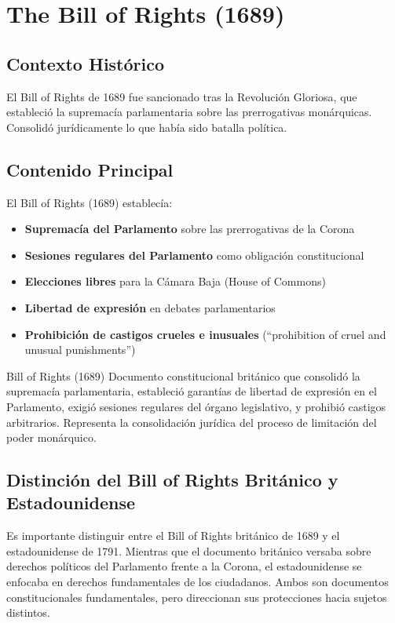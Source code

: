 \documentclass[12pt,oneside]{book}
\begin{document}
\section{The Bill of Rights (1689)}

\subsection{Contexto Histórico}

El Bill of Rights de 1689 fue sancionado tras la Revolución Gloriosa, que estableció la supremacía parlamentaria sobre las prerrogativas monárquicas. Consolidó jurídicamente lo que había sido batalla política.

\subsection{Contenido Principal}

El Bill of Rights (1689) establecía:

\begin{itemize}
    \item \textbf{Supremacía del Parlamento} sobre las prerrogativas de la Corona
    \item \textbf{Sesiones regulares del Parlamento} como obligación constitucional
    \item \textbf{Elecciones libres} para la Cámara Baja (House of Commons)
    \item \textbf{Libertad de expresión} en debates parlamentarios
    \item \textbf{Prohibición de castigos crueles e inusuales} (``prohibition of cruel and unusual punishments'')
\end{itemize}

\begin{definition}{Bill of Rights (1689)}
Documento constitucional británico que consolidó la supremacía parlamentaria, estableció garantías de libertad de expresión en el Parlamento, exigió sesiones regulares del órgano legislativo, y prohibió castigos arbitrarios. Representa la consolidación jurídica del proceso de limitación del poder monárquico.
\end{definition}

\subsection{Distinción del Bill of Rights Británico y Estadounidense}

Es importante distinguir entre el Bill of Rights británico de 1689 y el estadounidense de 1791. Mientras que el documento británico versaba sobre derechos políticos del Parlamento frente a la Corona, el estadounidense se enfocaba en derechos fundamentales de los ciudadanos. Ambos son documentos constitucionales fundamentales, pero direccionan sus protecciones hacia sujetos distintos.
\end{document}
